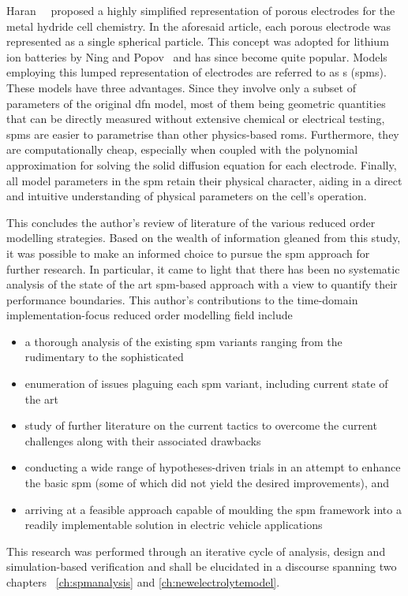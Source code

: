 Haran~\etal{}~\cite{Haran1998}  proposed a  highly simplified  representation of
porous  electrodes  for the  metal  hydride  cell  chemistry. In  the  aforesaid
article,  each   porous  electrode  was   represented  as  a   single  spherical
particle.  This concept  was  adopted  for lithium  ion  batteries  by Ning  and
Popov~\cite{Ning2004} and has since become  quite popular. Models employing this
lumped  representation  of  electrodes  are  referred  to  as  s
(\gls{spm}s).  These  models have  three  advantages.  Since they  involve  only
a  subset  of  parameters  of  the   original  \gls{dfn}  model,  most  of  them
being  geometric quantities  that  can be  directly  measured without  extensive
chemical  or electrical  testing,  \glspl{spm} are  easier  to parametrise  than
other physics-based  \glspl{rom}. Furthermore,  they are  computationally cheap,
especially when coupled with the  polynomial approximation for solving the solid
diffusion  equation for  each electrode.  Finally, all  model parameters  in the
\gls{spm}  retain their  physical character,  aiding in  a direct  and intuitive
understanding of physical parameters on the cell's operation.

This concludes  the author's review of  literature of the various  reduced order
modelling  strategies. Based  on the  wealth  of information  gleaned from  this
study,  it was  possible to  make  an informed  choice to  pursue the  \gls{spm}
approach  for further  research.  In particular,  it came  to  light that  there
has  been  no systematic  analysis  of  the  state  of the  art  \gls{spm}-based
approach with  a view  to quantify their  performance boundaries.  This author's
contributions to  the time-domain  implementation-focus reduced  order modelling
field include
\begin{itemize}[noitemsep,topsep=0pt, before={\vspace*{-0.25\baselineskip}}]
    \item a thorough analysis of the existing \gls{spm} variants ranging from the rudimentary to the sophisticated
    \item enumeration of issues plaguing each \gls{spm} variant, including current state of the art
    \item study of further literature on the current tactics to overcome the current challenges along with their associated drawbacks
    \item conducting a  wide range of hypotheses-driven trials in an attempt to enhance  the basic \gls{spm} (some of which did not yield the desired
        improvements), and
    \item arriving at  a  feasible  approach  capable  of  moulding  the
        \gls{spm}  framework into  a  readily implementable  solution in
        electric vehicle applications
\end{itemize}
This research was  performed through an iterative cycle of  analysis, design and
simulation-based verification  and shall be  elucidated in a  discourse spanning
two chapters \viz~\cref{ch:spmanalysis} and \cref{ch:newelectrolytemodel}.


